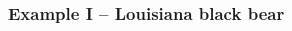 \documentclass[color=usenames,dvipsnames]{beamer}
\begin{document}
\begin{frame}
  \frametitle{Example I -- Louisiana black bear}
  \begin{columns}
    \begin{column}{0.5\textwidth}
    \end{column}
    \begin{column}{0.5\textwidth}

\end{column}
\end{columns}
\end{frame}
\end{document}
